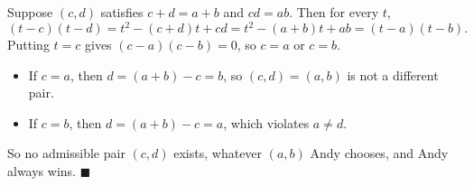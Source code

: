 Suppose $(c,d)$ satisfies $c+d=a+b$ and $cd=ab$. Then for every $t$,
\[
(t-c)(t-d)=t^2-(c+d)t+cd=t^2-(a+b)t+ab=(t-a)(t-b).
\]
Putting $t=c$ gives $(c-a)(c-b)=0$, so $c=a$ or $c=b$.
\begin{itemize}
\item If $c=a$, then $d=(a+b)-c=b$, so $(c,d)=(a,b)$ is not a different pair.
\item If $c=b$, then $d=(a+b)-c=a$, which violates $a\ne d$.
\end{itemize}
So no admissible pair $(c,d)$ exists, whatever $(a,b)$ Andy chooses, and Andy always wins. $\blacksquare$
